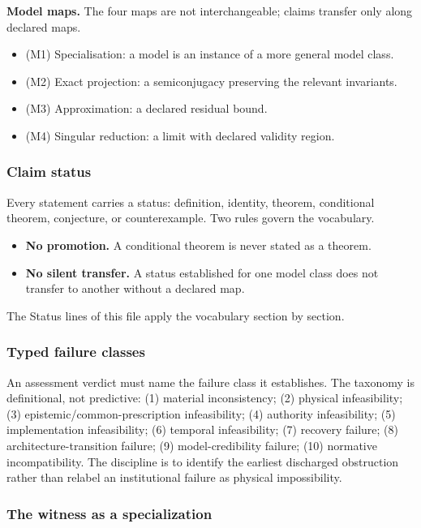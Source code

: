 \textbf{Model maps.} The four maps are not interchangeable; claims transfer only along declared maps.

\begin{itemize}[leftmargin=2em]
\item (M1) Specialisation: a model is an instance of a more general model class.
\item (M2) Exact projection: a semiconjugacy preserving the relevant invariants.
\item (M3) Approximation: a declared residual bound.
\item (M4) Singular reduction: a limit with declared validity region.
\end{itemize}


\subsubsection{Claim status}

Every statement carries a status: definition, identity, theorem, conditional theorem, conjecture, or counterexample. Two rules govern the vocabulary.

\begin{itemize}[leftmargin=2em]
\item \textbf{No promotion.} A conditional theorem is never stated as a theorem.
\item \textbf{No silent transfer.} A status established for one model class does not transfer to another without a declared map.
\end{itemize}

The Status lines of this file apply the vocabulary section by section.


\subsubsection{Typed failure classes}

An assessment verdict must name the failure class it establishes. The taxonomy is definitional, not predictive: (1) material inconsistency; (2) physical infeasibility; (3) epistemic/common-prescription infeasibility; (4) authority infeasibility; (5) implementation infeasibility; (6) temporal infeasibility; (7) recovery failure; (8) architecture-transition failure; (9) model-credibility failure; (10) normative incompatibility. The discipline is to identify the earliest discharged obstruction rather than relabel an institutional failure as physical impossibility.


\subsubsection{The witness as a specialization}

